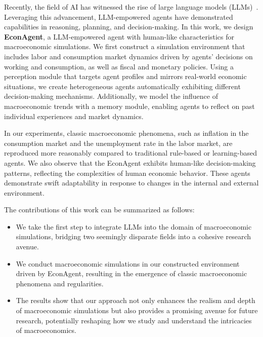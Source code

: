 Recently, the field of AI has witnessed the rise of large language models (LLMs)~\cite{zhao2023survey}. Leveraging this advancement, LLM-empowered agents have demonstrated capabilities in reasoning, planning, and decision-making. In this work, we design \textbf{EconAgent}, a LLM-empowered agent with human-like characteristics for macroeconomic simulations. We first construct a simulation environment that includes labor and consumption market dynamics driven by agents' decisions on working and consumption, as well as fiscal and monetary policies. Using a perception module that targets agent profiles and mirrors real-world economic situations, we create heterogeneous agents automatically exhibiting different decision-making mechanisms. Additionally, we model the influence of macroeconomic trends with a memory module, enabling agents to reflect on past individual experiences and market dynamics.

In our experiments, classic macroeconomic phenomena, such as inflation in the consumption market and the unemployment rate in the labor market, are reproduced more reasonably compared to traditional rule-based or learning-based agents. We also observe that the EconAgent exhibits human-like decision-making patterns, reflecting the complexities of human economic behavior. These agents demonstrate swift adaptability in response to changes in the internal and external environment.

The contributions of this work can be summarized as follows:
\begin{itemize}[leftmargin=*]
    \item We take the first step to integrate LLMs into the domain of macroeconomic simulations, bridging two seemingly disparate fields into a cohesive research avenue.
    \item We conduct macroeconomic simulations in our constructed environment driven by EconAgent, resulting in the emergence of classic macroeconomic phenomena and regularities.
    \item The results show that our approach not only enhances the realism and depth of macroeconomic simulations but also provides a promising avenue for future research, potentially reshaping how we study and understand the intricacies of macroeconomics.
\end{itemize}